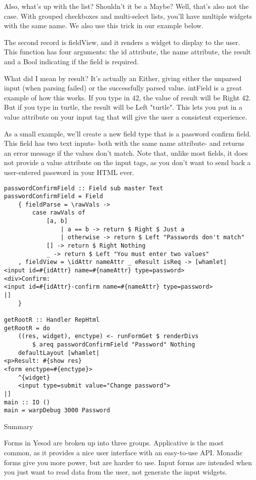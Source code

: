 Also, what's up with the list? Shouldn't it be a Maybe? Well, that's also not the case. With grouped checkboxes and multi-select lists, you'll have multiple widgets with the same name. We also use this trick in our example below.

The second record is fieldView, and it renders a widget to display to the user. This function has four arguments: the id attribute, the name attribute, the result and a Bool indicating if the field is required.

What did I mean by result? It's actually an Either, giving either the unparsed input (when parsing failed) or the successfully parsed value. intField is a great example of how this works. If you type in 42, the value of result will be Right 42. But if you type in turtle, the result will be Left "turtle". This lets you put in a value attribute on your input tag that will give the user a consistent experience.

As a small example, we'll create a new field type that is a password confirm field. This field has two text inputs- both with the same name attribute- and returns an error message if the values don't match. Note that, unlike most fields, it does not provide a value attribute on the input tags, as you don't want to send back a user-entered password in your HTML ever.

\begin{lstlisting}
passwordConfirmField :: Field sub master Text
passwordConfirmField = Field
    { fieldParse = \rawVals ->
        case rawVals of
            [a, b]
                | a == b -> return $ Right $ Just a
                | otherwise -> return $ Left "Passwords don't match"
            [] -> return $ Right Nothing
            _ -> return $ Left "You must enter two values"
    , fieldView = \idAttr nameAttr _ eResult isReq -> [whamlet|
<input id=#{idAttr} name=#{nameAttr} type=password>
<div>Confirm:
<input id=#{idAttr}-confirm name=#{nameAttr} type=password>
|]
    }

getRootR :: Handler RepHtml
getRootR = do
    ((res, widget), enctype) <- runFormGet $ renderDivs
        $ areq passwordConfirmField "Password" Nothing
    defaultLayout [whamlet|
<p>Result: #{show res}
<form enctype=#{enctype}>
    ^{widget}
    <input type=submit value="Change password">
|]
main :: IO ()
main = warpDebug 3000 Password
\end{lstlisting}

Summary

Forms in Yesod are broken up into three groups. Applicative is the most common, as it provides a nice user interface with an easy-to-use API. Monadic forms give you more power, but are harder to use. Input forms are intended when you just want to read data from the user, not generate the input widgets.

